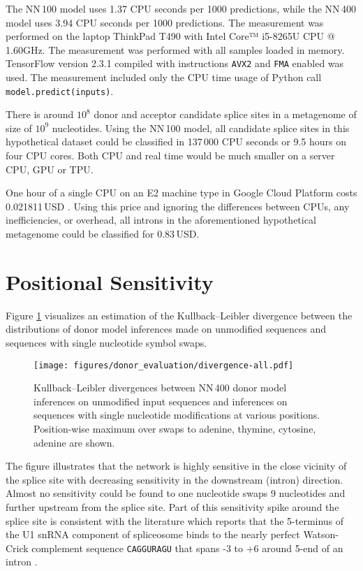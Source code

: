 The NN\,100 model uses 1.37 CPU seconds per 1000 predictions, while the NN\,400
model uses 3.94 CPU seconds per 1000 predictions. The measurement was performed
on the laptop ThinkPad T490 with Intel\textsuperscript{\tiny\textregistered}
Core™ i5-8265U CPU @ 1.60GHz. The measurement was performed with all samples
loaded in memory. TensorFlow version 2.3.1 compiled with instructions
\Verb_AVX2_ and \Verb_FMA_ enabled was used. The measurement included only the
CPU time usage of Python call \Verb_model.predict(inputs)_.

There is around $10^8$ donor and acceptor candidate splice sites in a
metagenome of size of $10^9$ nucleotides. Using the NN\,100 model, all
candidate splice sites in this hypothetical dataset could be classified in
137\,000 CPU seconds or 9.5 hours on four CPU cores. Both CPU and real time
would be much smaller on a server CPU, GPU or TPU.

One hour of a single CPU on an E2 machine type in Google Cloud Platform costs
0.021811\,USD \cite{gcp-pricing}. Using this price and ignoring the differences
between CPUs, any inefficiencies, or overhead, all introns in the
aforementioned hypothetical metagenome could be classified for 0.83\,USD.

\section{\label{ch:evaluation:sensitivity}Positional Sensitivity}

Figure \ref{fig:evaluation:donor-divergence-all} visualizes an estimation of
the Kullback–Leibler divergence between the distributions of donor model
inferences made on unmodified sequences and sequences with single nucleotide
symbol swaps.

\begin{figure}
  \centering
  \texttt{[image: figures/donor\_evaluation/divergence-all.pdf]}
  \caption{Kullback–Leibler divergences between NN\,400 donor model inferences
    on unmodified input sequences and inferences on sequences with single
    nucleotide modifications at various positions. Position-wise maximum over
    swaps to adenine, thymine, cytosine, adenine are shown.}
  \label{fig:evaluation:donor-divergence-all}
\end{figure}

The figure illustrates that the network is highly sensitive in the close
vicinity of the splice site with decreasing sensitivity in the downstream
(intron) direction. Almost no sensitivity could be found to one nucleotide
swaps 9 nucleotides and further upstream from the splice site. Part of this
sensitivity spike around the splice site is consistent with the literature
which reports that the 5\textquotesingle{}-terminus of the U1 snRNA component
of spliceosome binds to the nearly perfect Watson-Crick complement sequence
\Verb_CAGGURAGU_ that spans -3 to +6 around 5\textquotesingle{}-end of an
intron \cite{de2013exon}.

